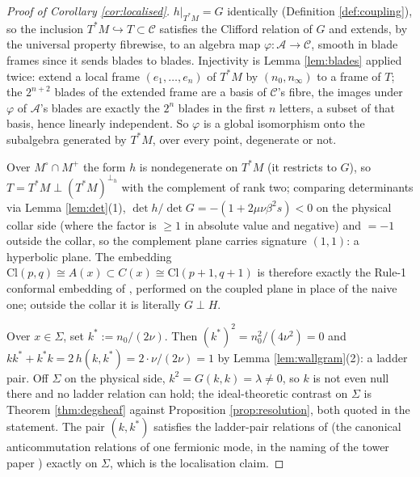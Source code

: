 \documentclass[11pt]{article}
\theoremstyle{definition}
\newcommand{\Cl}{\mathrm{Cl}}
\newcommand{\shA}{\mathcal{A}}
\newcommand{\shC}{\mathcal{C}}
\newcommand{\Sig}{\Sigma}
\newcommand{\Mo}{M^{\circ}}
\newcommand{\Mp}{M^{+}}
\newcommand{\nO}{n_0}
\newcommand{\nInf}{n_\infty}
\begin{document}
\begin{proof}[Proof of Corollary \ref{cor:localised}]
$h|_{T^*M} = G$ identically (Definition \ref{def:coupling}), so the inclusion $T^*M \hookrightarrow T \subset \shC$ satisfies the Clifford relation of $G$ and extends, by the universal property fibrewise, to an algebra map $\varphi : \shA \to \shC$, smooth in blade frames since it sends blades to blades. Injectivity is Lemma \ref{lem:blades} applied twice: extend a local frame $(e_1, \dots, e_n)$ of $T^*M$ by $(\nO, \nInf)$ to a frame of $T$; the $2^{n+2}$ blades of the extended frame are a basis of $\shC$'s fibre, the images under $\varphi$ of $\shA$'s blades are exactly the $2^n$ blades in the first $n$ letters, a subset of that basis, hence linearly independent. So $\varphi$ is a global isomorphism onto the subalgebra generated by $T^*M$, over every point, degenerate or not.

Over $\Mo \cap \Mp$ the form $h$ is nondegenerate on $T^*M$ (it restricts to $G$), so $T = T^*M \perp (T^*M)^{\perp_h}$ with the complement of rank two; comparing determinants via Lemma \ref{lem:det}(1), $\det h / \det G = -(1 + 2\mu\nu\beta^2 s) < 0$ on the physical collar side (where the factor is $\geq 1$ in absolute value and negative) and $= -1$ outside the collar, so the complement plane carries signature $(1,1)$: a hyperbolic plane. The embedding $\Cl(p,q) \cong A(x) \subset C(x) \cong \Cl(p{+}1, q{+}1)$ is therefore exactly the Rule-1 conformal embedding of \cite[\S4.3]{ButlerT1}, performed on the coupled plane in place of the naive one; outside the collar it is literally $G \perp H$.

Over $x \in \Sig$, set $k^* := \nO/(2\nu)$. Then $(k^*)^2 = \nO^2/(4\nu^2) = 0$ and $k k^* + k^* k = 2\,h(k, k^*) = 2 \cdot \nu/(2\nu) = 1$ by Lemma \ref{lem:wallgram}(2): a ladder pair. Off $\Sig$ on the physical side, $k^2 = G(k,k) = \lambda \neq 0$, so $k$ is not even null there and no ladder relation can hold; the ideal-theoretic contrast on $\Sig$ is Theorem \ref{thm:degsheaf} against Proposition \ref{prop:resolution}, both quoted in the statement. The pair $(k, k^*)$ satisfies the ladder-pair relations of \cite[\S7]{ButlerT1} (the canonical anticommutation relations of one fermionic mode, in the naming of the tower paper \cite{ButlerT3}) exactly on $\Sig$, which is the localisation claim.
\end{proof}
\end{document}
